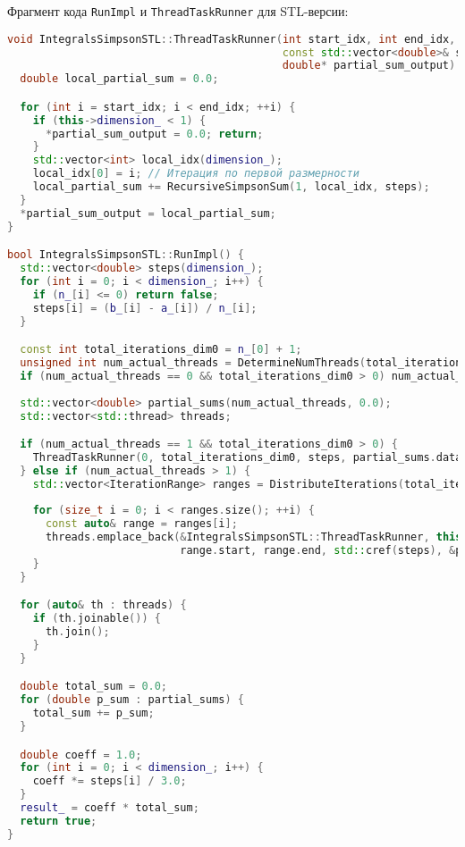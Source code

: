 \documentclass[a4paper,12pt]{article}
\begin{document}
Фрагмент кода \texttt{RunImpl} и \texttt{ThreadTaskRunner} для STL-версии:
\begin{lstlisting}[language=C++, caption=Функция ThreadTaskRunner и фрагмент RunImpl для STL-реализации (ops\_stl.cpp), basicstyle=\ttfamily\scriptsize]
void IntegralsSimpsonSTL::ThreadTaskRunner(int start_idx, int end_idx, 
                                           const std::vector<double>& steps,
                                           double* partial_sum_output) {
  double local_partial_sum = 0.0;

  for (int i = start_idx; i < end_idx; ++i) {
    if (this->dimension_ < 1) {
      *partial_sum_output = 0.0; return;
    }
    std::vector<int> local_idx(dimension_);
    local_idx[0] = i; // Итерация по первой размерности
    local_partial_sum += RecursiveSimpsonSum(1, local_idx, steps);
  }
  *partial_sum_output = local_partial_sum;
}

bool IntegralsSimpsonSTL::RunImpl() {
  std::vector<double> steps(dimension_);
  for (int i = 0; i < dimension_; i++) {
    if (n_[i] <= 0) return false;
    steps[i] = (b_[i] - a_[i]) / n_[i];
  }

  const int total_iterations_dim0 = n_[0] + 1;
  unsigned int num_actual_threads = DetermineNumThreads(total_iterations_dim0);
  if (num_actual_threads == 0 && total_iterations_dim0 > 0) num_actual_threads = 1;
  
  std::vector<double> partial_sums(num_actual_threads, 0.0);
  std::vector<std::thread> threads;

  if (num_actual_threads == 1 && total_iterations_dim0 > 0) {
    ThreadTaskRunner(0, total_iterations_dim0, steps, partial_sums.data());
  } else if (num_actual_threads > 1) {
    std::vector<IterationRange> ranges = DistributeIterations(total_iterations_dim0, num_actual_threads);
    
    for (size_t i = 0; i < ranges.size(); ++i) {
      const auto& range = ranges[i];
      threads.emplace_back(&IntegralsSimpsonSTL::ThreadTaskRunner, this, 
                           range.start, range.end, std::cref(steps), &partial_sums[i]);
    }
  }

  for (auto& th : threads) {
    if (th.joinable()) {
      th.join();
    }
  }

  double total_sum = 0.0;
  for (double p_sum : partial_sums) {
    total_sum += p_sum;
  }

  double coeff = 1.0;
  for (int i = 0; i < dimension_; i++) {
    coeff *= steps[i] / 3.0;
  }
  result_ = coeff * total_sum;
  return true;
}
\end{lstlisting}
\end{document}
